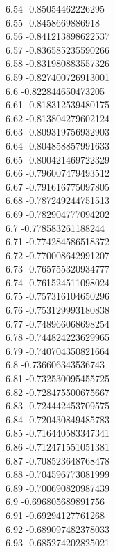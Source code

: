 {6.54	-0.85054462226295\\
6.55	-0.8458669886918\\
6.56	-0.841213898622537\\
6.57	-0.836585235590266\\
6.58	-0.831980883557326\\
6.59	-0.827400726913001\\
6.6	-0.822844650473205\\
6.61	-0.818312539480175\\
6.62	-0.813804279602124\\
6.63	-0.809319756932903\\
6.64	-0.804858857991633\\
6.65	-0.800421469722329\\
6.66	-0.796007479493512\\
6.67	-0.791616775097805\\
6.68	-0.787249244751513\\
6.69	-0.782904777094202\\
6.7	-0.778583261188244\\
6.71	-0.774284586518372\\
6.72	-0.770008642991207\\
6.73	-0.765755320934777\\
6.74	-0.761524511098024\\
6.75	-0.757316104650296\\
6.76	-0.753129993180838\\
6.77	-0.748966068698254\\
6.78	-0.744824223629965\\
6.79	-0.740704350821664\\
6.8	-0.736606343536743\\
6.81	-0.732530095455725\\
6.82	-0.728475500675667\\
6.83	-0.724442453709575\\
6.84	-0.720430849485783\\
6.85	-0.716440583347341\\
6.86	-0.712471551051381\\
6.87	-0.708523648768478\\
6.88	-0.704596773081999\\
6.89	-0.700690820987439\\
6.9	-0.696805689891756\\
6.91	-0.69294127761268\\
6.92	-0.689097482378033\\
6.93	-0.685274202825021\\
}
